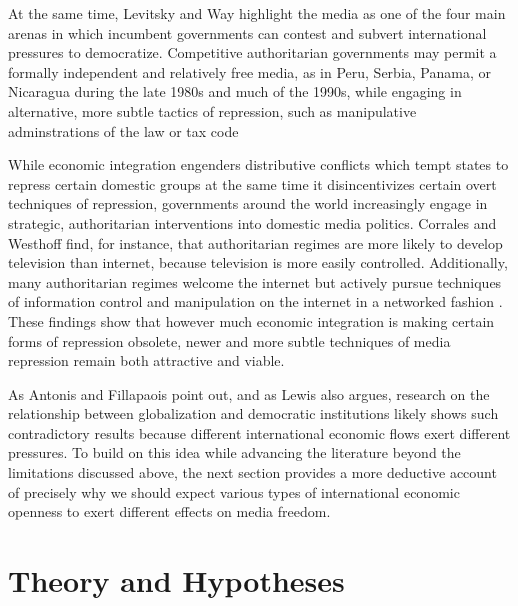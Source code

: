 \documentclass[a4paper]{article}\usepackage[]{graphicx}\usepackage[]{color}
\begin{document}
At the same time, Levitsky and Way highlight the media as one of the four main arenas in which incumbent governments can contest and subvert international pressures to democratize. Competitive authoritarian governments may permit a formally independent and relatively free media, as in Peru, Serbia, Panama, or Nicaragua during the late 1980s and much of the 1990s, while engaging in alternative, more subtle tactics of repression, such as manipulative adminstrations of the law or tax code \parencite[53, 58]{Levitsky:2002gx}

While economic integration engenders distributive conflicts which tempt states to repress certain domestic groups at the same time it disincentivizes certain overt techniques of repression, governments around the world increasingly engage in strategic, authoritarian interventions into domestic media politics. Corrales and Westhoff \parencite*{Corrales:2006vz} find, for instance, that authoritarian regimes are more likely to develop television than internet, because television is more easily controlled. Additionally, many authoritarian regimes welcome the internet but actively pursue techniques of information control and manipulation on the internet in a networked fashion \parencites{MacKinnon:2011id}{Pearce:2012fm}. These findings show that however much economic integration is making certain forms of repression obsolete, newer and more subtle techniques of media repression remain both attractive and viable.

As Antonis and Fillapaois point out, and as Lewis also argues, research on the relationship between globalization and democratic institutions likely shows such contradictory results because different international economic flows exert different pressures. To build on this idea while advancing the literature beyond the limitations discussed above, the next section provides a more deductive account of precisely why we should expect various types of international economic openness to exert different effects on media freedom.

\section{Theory and Hypotheses}
\end{document}
